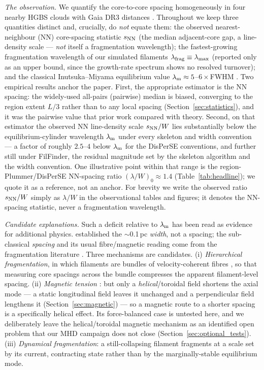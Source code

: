\documentclass[usenatbib,twoside,twocolumn]{mnras}
\begin{document}
\emph{The observation.} We quantify the core-to-core spacing homogeneously in four nearby HGBS clouds with Gaia DR3 distances \citep{Zhang2023}. Throughout we keep three quantities distinct and, crucially, do \emph{not} equate them: the observed nearest-neighbour (NN) core-spacing statistic $s_{\rm NN}$ (the median adjacent-core gap, a line-density scale --- \emph{not} itself a fragmentation wavelength); the fastest-growing fragmentation wavelength of our simulated filaments $\lambda_{\rm frag}\equiv\lambda_{\rm max}$ (reported only as an upper bound, since the growth-rate spectrum shows no resolved turnover); and the classical Inutsuka--Miyama equilibrium value $\lambda_{\rm m}\approx5$--$6\times$FWHM \citep{Inutsuka1992,Fischera2012}. Two empirical results anchor the paper. First, the appropriate estimator is the NN spacing: the widely-used all-pairs (pairwise) median is biased, converging to the region extent $L/3$ rather than to any local spacing (Section~\ref{sec:statistics}), and it was the pairwise value that prior work compared with theory. Second, on that estimator the observed NN line-density scale $s_{\rm NN}/W$ lies substantially below the equilibrium-cylinder wavelength $\lambda_{\rm m}$ under every skeleton and width convention --- a factor of roughly $2.5$--$4$ below $\lambda_{\rm m}$ for the DisPerSE conventions, and further still under FilFinder, the residual magnitude set by the skeleton algorithm and the width convention. One illustrative point within that range is the region-Plummer/DisPerSE NN-spacing ratio $(\lambda/W)_0\approx1.4$ (Table~\ref{tab:headline}); we quote it as a reference, not an anchor. For brevity we write the observed ratio $s_{\rm NN}/W$ simply as $\lambda/W$ in the observational tables and figures; it denotes the NN-spacing statistic, never a fragmentation wavelength.

\emph{Candidate explanations.} Such a deficit relative to $\lambda_{\rm m}$ has been read as evidence for additional physics. \citet{Arzoumanian2019} established the $\sim$0.1\,pc \emph{width}, not a spacing; the sub-classical \emph{spacing} and its usual fibre/magnetic reading come from the fragmentation literature \citep{Fischera2012,Zhang2023cal}. Three mechanisms are candidates. (i) \emph{Hierarchical fragmentation}, in which filaments are bundles of velocity-coherent fibres \citep{Hacar2013,Hacar2018,Yang2024}, so that measuring core spacings across the bundle compresses the apparent filament-level spacing. (ii) \emph{Magnetic tension} \citep{Nakamura1993}: but only a \emph{helical}/toroidal field shortens the axial mode --- a static longitudinal field leaves it unchanged and a perpendicular field lengthens it (Section~\ref{sec:magnetic}) --- so a magnetic route to a shorter spacing is a specifically helical effect. Its force-balanced case is untested here, and we deliberately leave the helical/toroidal magnetic mechanism as an identified open problem that our MHD campaign does not close (Section~\ref{sec:optional_tests}). (iii) \emph{Dynamical fragmentation}: a still-collapsing filament fragments at a scale set by its current, contracting state rather than by the marginally-stable equilibrium mode.
\end{document}
